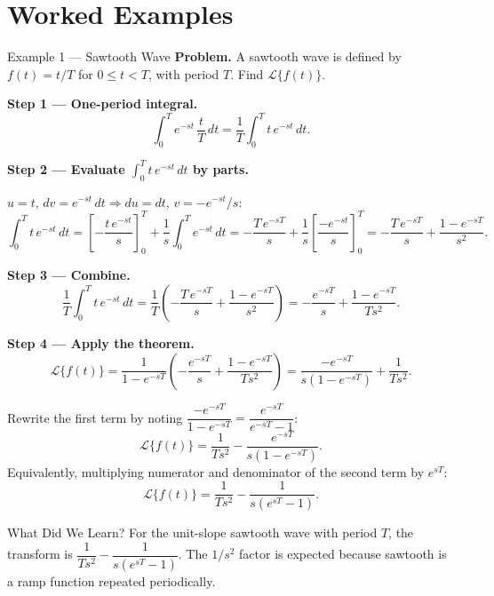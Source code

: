 \documentclass[12pt,a4paper]{article}
\begin{document}
\section{Worked Examples}

\begin{infobox}{Example 1 --- Sawtooth Wave}
\textbf{Problem.}  A sawtooth wave is defined by $f(t) = t/T$ for
$0 \leq t < T$, with period $T$.  Find $\mathcal{L}\{f(t)\}$.

\textbf{Step 1 --- One-period integral.}
\[
  \int_0^T e^{-st}\,\frac{t}{T}\,dt = \frac{1}{T}\int_0^T t\,e^{-st}\,dt.
\]

\textbf{Step 2 --- Evaluate $\int_0^T t\,e^{-st}\,dt$ by parts.}

$u = t$, $dv = e^{-st}\,dt \Rightarrow du = dt$, $v = -e^{-st}/s$:
\[
  \int_0^T t\,e^{-st}\,dt
  = \left[-\frac{t\,e^{-st}}{s}\right]_0^T + \frac{1}{s}\int_0^T e^{-st}\,dt
  = -\frac{T\,e^{-sT}}{s} + \frac{1}{s}\left[\frac{-e^{-st}}{s}\right]_0^T
  = -\frac{T\,e^{-sT}}{s} + \frac{1-e^{-sT}}{s^2}.
\]

\textbf{Step 3 --- Combine.}
\[
  \frac{1}{T}\int_0^T t\,e^{-st}\,dt
  = \frac{1}{T}\left(-\frac{T\,e^{-sT}}{s} + \frac{1-e^{-sT}}{s^2}\right)
  = -\frac{e^{-sT}}{s} + \frac{1-e^{-sT}}{Ts^2}.
\]

\textbf{Step 4 --- Apply the theorem.}
\[
  \mathcal{L}\{f(t)\}
  = \frac{1}{1-e^{-sT}}
    \left(-\frac{e^{-sT}}{s} + \frac{1-e^{-sT}}{Ts^2}\right)
  = \frac{-e^{-sT}}{s(1-e^{-sT})} + \frac{1}{Ts^2}.
\]

Rewrite the first term by noting
$\dfrac{-e^{-sT}}{1-e^{-sT}} = \dfrac{e^{-sT}}{e^{-sT}-1}$:
\[
  \mathcal{L}\{f(t)\}
  = \frac{1}{Ts^2} - \frac{e^{-sT}}{s(1-e^{-sT})}.
\]
Equivalently, multiplying numerator and denominator of the second term by
$e^{sT}$:
\[
  \boxed{
  \mathcal{L}\{f(t)\} = \frac{1}{Ts^2} - \frac{1}{s(e^{sT}-1)}.
  }
\]
\end{infobox}

\begin{learnbox}{What Did We Learn?}
For the unit-slope sawtooth wave with period $T$, the transform is
$\dfrac{1}{Ts^2} - \dfrac{1}{s(e^{sT}-1)}$.  The $1/s^2$ factor is expected
because sawtooth is a ramp function repeated periodically.
\end{learnbox}
\end{document}
